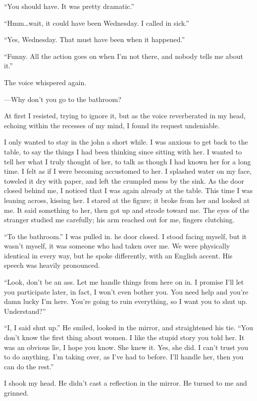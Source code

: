 \documentclass[
]{article}
\begin{document}
``You should have. It was pretty dramatic.''

``Hmm\ldots wait, it could have been Wednesday. I called in sick.''

``Yes, Wednesday. That must have been when it happened.''

``Funny. All the action goes on when I'm not there, and nobody tells me
about it.''

The voice whispered again.

---Why don't you go to the bathroom?

At first I resisted, trying to ignore it, but as the voice reverberated
in my head, echoing within the recesses of my mind, I found its request
undeniable.

I only wanted to stay in the john a short while. I was anxious to get
back to the table, to say the things I had been thinking since sitting
with her. I wanted to tell her what I truly thought of her, to talk as
though I had known her for a long time. I felt as if I were becoming
accustomed to her. I splashed water on my face, toweled it dry with
paper, and left the crumpled mess by the sink. As the door closed behind
me, I noticed that I was again already at the table. This time I was
leaning across, kissing her. I stared at the figure; it broke from her
and looked at me. It said something to her, then got up and strode
toward me. The eyes of the stranger studied me carefully; his arm
reached out for me, fingers clutching.

``To the bathroom.'' I was pulled in. he door closed. I stood facing
myself, but it wasn't myself, it was someone who had taken over me. We
were physically identical in every way, but he spoke differently, with
an English accent. His speech was heavily pronounced.

``Look, don't be an ass. Let me handle things from here on in. I promise
I'll let you participate later, in fact, I won't even bother you. You
need help and you're damn lucky I'm here. You're going to ruin
everything, so I want you to shut up. Understand?''

``I, I said shut up.'' He smiled, looked in the mirror, and straightened
his tie. ``You don't know the first thing about women. I like the stupid
story you told her. It was an obvious lie, I hope you know. She knew it.
Yes, she did. I can't trust you to do anything. I'm taking over, as I've
had to before. I'll handle her, then you can do the rest.''

I shook my head. He didn't cast a reflection in the mirror. He turned to
me and grinned.
\end{document}
